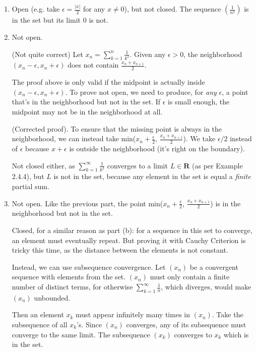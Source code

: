 \documentclass{oxmathproblems}
\begin{document}
\begin{questions}
\begin{solution}
\begin{enumerate}[label=(\alph*)]
    \item Open (e.g. take $\epsilon = \frac{|x|}{2}$ for any $x \neq 0$), but not closed. The sequence $(\frac{1}{n^2})$ is in the set but its limit 0 is not.
    
    \item Not open. 
    
    (Not quite correct) Let $x_{n} = \sum_{k=1}^{n}\frac{1}{k^2}$. Given any $\epsilon > 0$, the neighborhood $(x_{n}-\epsilon, x_{n}+\epsilon)$ does not contain $\frac{x_{n} + x_{n+1}}{2}$.

    The proof above is only valid if the midpoint is actually inside $(x_{n}-\epsilon, x_{n}+\epsilon)$. To prove not open, we need to produce, for \textit{any} $\epsilon$, a
    point that's in the neighborhood but not in the set. If $\epsilon$ is small enough, the midpoint may not be in the neighborhood at all.

    (Corrected proof). To ensure that the missing point is always in the neighborhood, we can instead take min($x_{n}+\frac{\epsilon}{2}$, $\frac{x_{n} + x_{n+1}}{2}$). We take
    $\epsilon/2$ instead of $\epsilon$ because $x+\epsilon$ is outside the neighborhood (it's right on the boundary).
    
    Not closed either, as $\sum_{k=1}^{\infty}\frac{1}{k^2}$ converges to a limit $L \in \textbf{R}$ (as per Example 2.4.4), but $L$ is not in the set, because any element in the
    set is equal a \textit{finite} partial sum.

    \item Not open. Like the previous part, the point min($x_{n}+\frac{\epsilon}{2}$, $\frac{x_{n} + x_{n+1}}{2}$) is in the neighborhood but not in the set.
    
    Closed, for a similar reason as part (b): for a sequence in this set to converge, an element must eventually repeat. But proving it with Cauchy Criterion is tricky this time,
    as the distance between the elements is not constant.

    Instead, we can use subsequence convergence. Let $(x_{n})$ be a convergent sequence with elements from the set. $(x_{n})$ must only contain a finite number of distinct terms,
    for otherwise $\sum_{k=1}^{\infty}\frac{1}{n}$, which diverges, would make $(x_{n})$ unbounded.
    
    Then an element $x_{k}$ must appear infinitely many times in $(x_{n})$. Take the
    subsequence of all $x_{k}$'s. Since $(x_{n})$ converges, any of its subsequence must converge to the same limit. The subsequence $(x_{k})$ converges to $x_{k}$ which is in the set.
  \end{enumerate}
\end{solution}


\end{questions}
\end{document}
